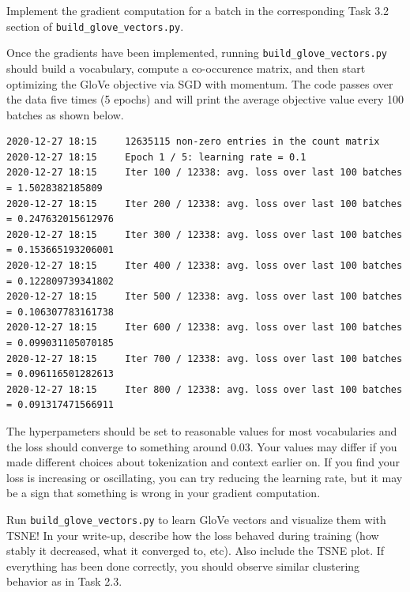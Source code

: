 \documentclass[a4paper,10pt]{article}
\begin{document}
%
\vspace{5pt}
\begin{taskbox}
 Implement the gradient computation for a batch in the corresponding Task 3.2 section of \texttt{build\_glove\_vectors.py}.
\end{taskbox} 
\vspace{5pt}

Once the gradients have been implemented, running \texttt{build\_glove\_vectors.py} should build a vocabulary, compute a co-occurence matrix, and then start optimizing the GloVe objective via SGD with momentum. The code passes over the data five times (5 epochs) and will print the average objective value every 100 batches as shown below.
%
\begin{center}
\begin{minipage}{0.95\textwidth}
\begin{lstlisting}
2020-12-27 18:15     12635115 non-zero entries in the count matrix
2020-12-27 18:15     Epoch 1 / 5: learning rate = 0.1
2020-12-27 18:15     Iter 100 / 12338: avg. loss over last 100 batches = 1.5028382185809
2020-12-27 18:15     Iter 200 / 12338: avg. loss over last 100 batches = 0.247632015612976
2020-12-27 18:15     Iter 300 / 12338: avg. loss over last 100 batches = 0.153665193206001
2020-12-27 18:15     Iter 400 / 12338: avg. loss over last 100 batches = 0.122809739341802
2020-12-27 18:15     Iter 500 / 12338: avg. loss over last 100 batches = 0.106307783161738
2020-12-27 18:15     Iter 600 / 12338: avg. loss over last 100 batches = 0.099031105070185
2020-12-27 18:15     Iter 700 / 12338: avg. loss over last 100 batches = 0.096116501282613
2020-12-27 18:15     Iter 800 / 12338: avg. loss over last 100 batches = 0.091317471566911
\end{lstlisting}
\end{minipage}
\end{center}
%
The hyperpameters should be set to reasonable values for most vocabularies and the loss should converge to something around 0.03. Your values may differ if you made different choices about tokenization and context earlier on. If you find your loss is increasing or oscillating, you can try reducing the learning rate, but it may be a sign that something is wrong in your gradient computation. 
%
\vspace{5pt}
\begin{taskbox}
 Run \texttt{build\_glove\_vectors.py} to learn GloVe vectors and visualize them with TSNE! In your write-up, describe how the loss behaved during training (how stably it decreased, what it converged to, etc). Also include the TSNE plot. If everything has been done correctly, you should observe similar clustering behavior as in Task 2.3.
\end{taskbox} 
\vspace{5pt}
%
\end{document}
